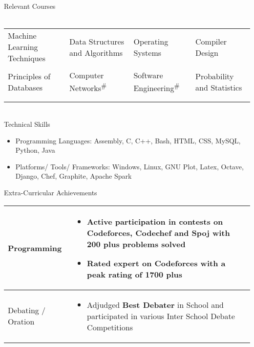 \documentclass{article}
\begin{document}
{\Large Relevant Courses}\\\\
\begin{tabular}{p{5cm} p{5cm} p{4cm} p{5cm}}
Machine Learning Techniques & Data Structures and Algorithms & Operating Systems & Compiler Design\\\\\vspace{-0.4cm}Principles of Databases &\vspace{-0.4cm} Computer Networks\textsuperscript{\#} &\vspace{-0.4cm}Software Engineering\textsuperscript{\#} & \vspace{-0.4cm}Probability and Statistics\\\\ & & & \vspace{-0.65cm}{\small{\#} : \emph{Ongoing}}
\end{tabular}\\
{\Large Technical Skills}
\renewcommand{\labelitemi}{$\bullet$}
\begin{itemize}[leftmargin=0.82cm]
\item Programming Languages: Assembly, C, C++, Bash, HTML, CSS, MySQL, 
Python, Java 
\item Platforms/ Tools/ Frameworks: Windows, Linux, GNU Plot, Latex, Octave, Django, Chef, Graphite, Apache Spark
\end{itemize}
{\Large Extra-Curricular Achievements}
\newline
\newline
\begin{tabular}{| m{3cm} |  m{15.4cm}|}
\hline
\vspace{0.3cm}Programming & \vspace{-0.4cm}\begin{itemize}[leftmargin=0.3cm]
\setlength\itemsep{0.2pt}\vspace{0.3cm}
\item Active participation in contests on Codeforces, Codechef and Spoj with \textbf{200 plus} problems solved
\item Rated expert on Codeforces with a peak rating of \textbf{1700 plus}
\end{itemize}\\
\hline
\vspace{0.3cm}Debating / Oration & \vspace{-0.4cm}\begin{itemize}[leftmargin=0.3cm]
\setlength\itemsep{0.2pt}\vspace{0.2cm}
\item Adjudged \textbf{Best Debater} in School and participated in various Inter School Debate Competitions
\end{itemize}\\
\hline
\end{tabular}\vspace{0.2cm}
\end{document}
